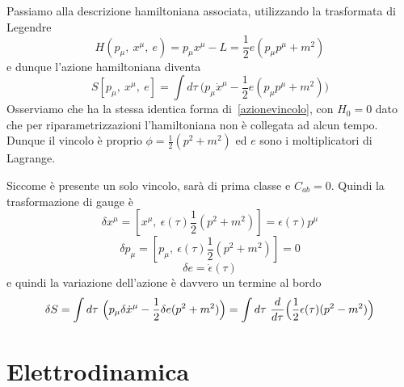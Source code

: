     \hfill

    Passiamo alla descrizione hamiltoniana associata, utilizzando la trasformata di Legendre 
\begin{equation*}
    H(p_\mu, ~x^\mu, ~e) = p_\mu x^\mu - L = \frac{1}{2} e (p_\mu p^\mu + m^2)
\end{equation*}
    e dunque l'azione hamiltoniana diventa 
\begin{equation*}
    S[p_\mu, ~x^\mu, ~e] = \int d\tau ~ \Big(p_\mu \dot x^\mu - \frac{1}{2} e (p_\mu p^\mu + m^2) \Big)
\end{equation*}
    Osserviamo che ha la stessa identica forma di~\eqref{azionevincolo}, con $H_0 = 0$ dato che per riparametrizzazioni l'hamiltoniana non è collegata ad alcun tempo. Dunque il vincolo è proprio $\phi = \frac{1}{2} (p^2 + m^2)$ ed $e$ sono i moltiplicatori di Lagrange. 

    Siccome è presente un solo vincolo, sarà di prima classe e $C_{ab} = 0$. Quindi la trasformazione di gauge è
\begin{equation*}
    \delta x^\mu = [x^\mu, ~\epsilon(\tau) \frac{1}{2} (p^2 + m^2)] = \epsilon(\tau) p^\mu
\end{equation*}
\begin{equation*}
    \delta p_\mu = [p_\mu, ~\epsilon(\tau) \frac{1}{2} (p^2 + m^2)] = 0
\end{equation*}
\begin{equation*}
    \delta e = \dot \epsilon(\tau)
\end{equation*}
    e quindi la variazione dell'azione è davvero un termine al bordo
\begin{equation*}
    \delta S = \int d\tau ~ \Big( p_\mu \delta \dot x^\mu - \frac{1}{2} \delta e (p^2 + m^2)\Big) = \int d\tau ~ \frac{d}{d\tau} \Big (\frac{1}{2} \epsilon(\tau) (p^2 - m^2) \Big)
\end{equation*}

\section{Elettrodinamica} 

